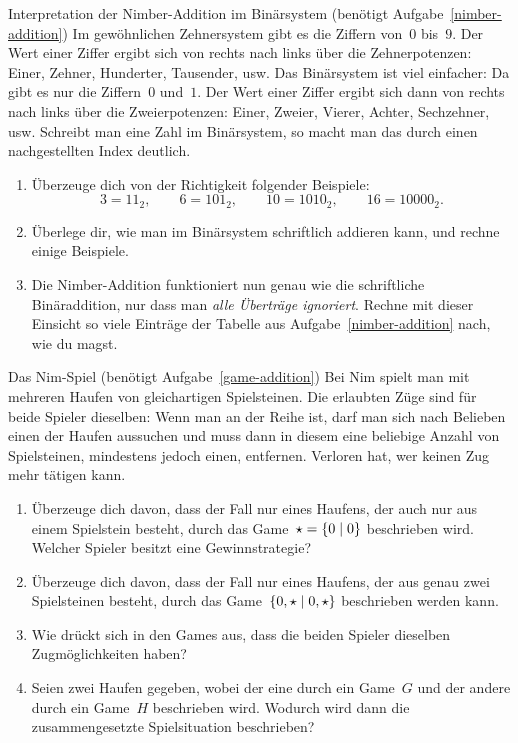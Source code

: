 \documentclass{zirkelblatt}
\begin{document}
\begin{aufgabe}{Interpretation der Nimber-Addition im Binärsystem
(benötigt Aufgabe~\ref{nimber-addition})}
\label{nimber-addition-binaer}
Im gewöhnlichen Zehnersystem gibt es die Ziffern von~$0$ bis~$9$. Der Wert
einer Ziffer ergibt sich von rechts nach links über die Zehnerpotenzen: Einer,
Zehner, Hunderter, Tausender, usw. Das Binärsystem ist viel einfacher: Da gibt
es nur die Ziffern~$0$ und~$1$. Der Wert einer Ziffer ergibt sich dann von
rechts nach links über die Zweierpotenzen: Einer, Zweier, Vierer, Achter,
Sechzehner, usw. Schreibt man eine Zahl im Binärsystem, so macht man das durch
einen nachgestellten Index deutlich.
\begin{enumerate}
\item Überzeuge dich von der Richtigkeit folgender Beispiele:
\[ 3 = 11_2, \qquad
  6 = 101_2, \qquad
  10 = 1010_2, \qquad
  16 = 10000_2. \]
\item Überlege dir, wie man im Binärsystem schriftlich addieren kann, und
rechne einige Beispiele.
\item Die Nimber-Addition funktioniert nun genau wie die schriftliche
Binäraddition, nur dass man \emph{alle Überträge ignoriert}. Rechne mit dieser
Einsicht so viele Einträge der Tabelle aus Aufgabe~\ref{nimber-addition} nach,
wie du magst.
\end{enumerate}
\end{aufgabe}

\begin{aufgabe}{Das Nim-Spiel (benötigt Aufgabe~\ref{game-addition})}
\label{nim}
Bei Nim spielt man mit mehreren Haufen von gleichartigen Spielsteinen. Die
erlaubten Züge sind für beide Spieler dieselben: Wenn man an der Reihe ist,
darf man sich nach Belieben einen der Haufen aussuchen und muss dann in diesem eine
beliebige Anzahl von Spielsteinen, mindestens jedoch einen, entfernen. Verloren
hat, wer keinen Zug mehr tätigen kann.
\begin{enumerate}
\item Überzeuge dich davon, dass der Fall nur eines Haufens, der auch nur aus
einem Spielstein besteht, durch das Game~$\star = \{ 0 \mathrel{|} 0 \}$ beschrieben wird.
Welcher Spieler besitzt eine Gewinnstrategie?
\item Überzeuge dich davon, dass der Fall nur eines Haufens, der aus genau zwei
Spielsteinen besteht, durch das Game~$\{ 0,\star \mathrel{|} 0,\star \}$ beschrieben
werden kann.
\item Wie drückt sich in den Games aus, dass die beiden Spieler dieselben
Zugmöglichkeiten haben?
\item Seien zwei Haufen gegeben, wobei der eine durch ein Game~$G$ und der
andere durch ein Game~$H$ beschrieben wird. Wodurch wird dann die
zusammengesetzte Spielsituation beschrieben?
\end{enumerate}
\end{aufgabe}
\end{document}
